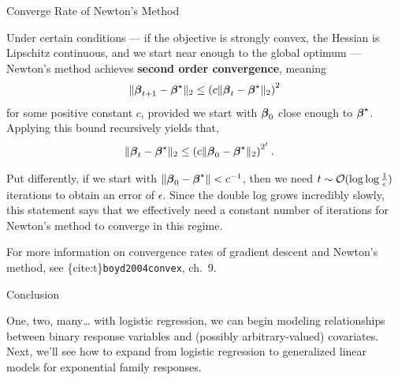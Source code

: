 \documentclass[aspectratio=169]{beamer}
\begin{document}
\begin{frame}[t,allowframebreaks]{Converge Rate of Newton's
Method}\label{converge-rate-of-newtons-method}

Under certain conditions --- if the objective is strongly convex, the
Hessian is Lipschitz continuous, and we start near enough to the global
optimum --- Newton's method achieves \textbf{second order convergence},
meaning \begin{align*}
\|\boldsymbol{\beta}_{t+1} - \boldsymbol{\beta}^\star\|_2 \leq \left(c \|\boldsymbol{\beta}_t - \boldsymbol{\beta}^\star\|_2\right)^2
\end{align*} for some positive constant \(c\), provided we start with
\(\boldsymbol{\beta}_0\) close enough to \(\boldsymbol{\beta}^\star\). Applying this bound
recursively yields that, \begin{align*}
\|\boldsymbol{\beta}_t - \boldsymbol{\beta}^\star\|_2 &\leq \left(c \|\boldsymbol{\beta}_0 - \boldsymbol{\beta}^\star\|_2 \right)^{2^t}.
\end{align*}

Put differently, if we start with
\(\|\boldsymbol{\beta}_0 - \boldsymbol{\beta}^\star\| < c^{-1}\), then we need
\(t \sim \mathcal{O}(\log \log \frac{1}{\epsilon})\) iterations to obtain an
error of \(\epsilon\). Since the double log grows incredibly slowly,
this statement says that we effectively need a constant number of
iterations for Newton's method to converge in this regime.

For more information on convergence rates of gradient descent and
Newton's method, see \{cite:t\}\texttt{boyd2004convex}, ch.~9.
\end{frame}

\begin{frame}[t,allowframebreaks]{Conclusion}\label{conclusion}

One, two, many\ldots{} with logistic regression, we can begin modeling
relationships between binary response variables and (possibly
arbitrary-valued) covariates. Next, we'll see how to expand from
logistic regression to generalized linear models for exponential family
responses.
\end{frame}
\end{document}
